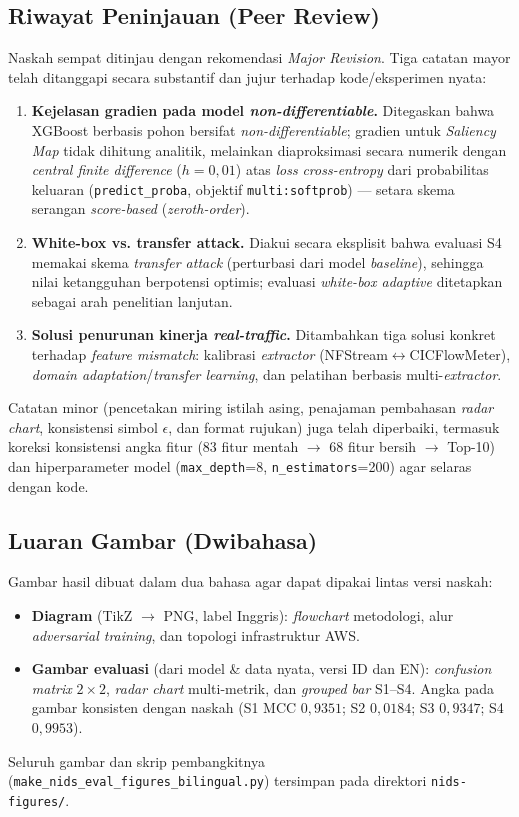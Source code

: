 \documentclass[11pt, a4paper]{article}
\begin{document}
\subsection{Riwayat Peninjauan (Peer Review)}
Naskah sempat ditinjau dengan rekomendasi \textit{Major Revision}. Tiga catatan mayor telah ditanggapi secara substantif dan jujur terhadap kode/eksperimen nyata:
\begin{enumerate}[leftmargin=1.4cm]
    \item \textbf{Kejelasan gradien pada model \textit{non-differentiable}.} Ditegaskan bahwa XGBoost berbasis pohon bersifat \textit{non-differentiable}; gradien untuk \textit{Saliency Map} tidak dihitung analitik, melainkan diaproksimasi secara numerik dengan \textit{central finite difference} ($h=0{,}01$) atas \textit{loss} \textit{cross-entropy} dari probabilitas keluaran (\texttt{predict\_proba}, objektif \texttt{multi:softprob}) --- setara skema serangan \textit{score-based} (\textit{zeroth-order}).
    \item \textbf{White-box vs. transfer attack.} Diakui secara eksplisit bahwa evaluasi S4 memakai skema \textit{transfer attack} (perturbasi dari model \textit{baseline}), sehingga nilai ketangguhan berpotensi optimis; evaluasi \textit{white-box adaptive} ditetapkan sebagai arah penelitian lanjutan.
    \item \textbf{Solusi penurunan kinerja \textit{real-traffic}.} Ditambahkan tiga solusi konkret terhadap \textit{feature mismatch}: kalibrasi \textit{extractor} (NFStream$\leftrightarrow$CICFlowMeter), \textit{domain adaptation}/\textit{transfer learning}, dan pelatihan berbasis multi-\textit{extractor}.
\end{enumerate}
Catatan minor (pencetakan miring istilah asing, penajaman pembahasan \textit{radar chart}, konsistensi simbol $\epsilon$, dan format rujukan) juga telah diperbaiki, termasuk koreksi konsistensi angka fitur (83 fitur mentah $\rightarrow$ 68 fitur bersih $\rightarrow$ Top-10) dan hiperparameter model (\texttt{max\_depth}=8, \texttt{n\_estimators}=200) agar selaras dengan kode.

\subsection{Luaran Gambar (Dwibahasa)}
Gambar hasil dibuat dalam dua bahasa agar dapat dipakai lintas versi naskah:
\begin{itemize}[leftmargin=1.4cm]
    \item \textbf{Diagram} (TikZ $\rightarrow$ PNG, label Inggris): \textit{flowchart} metodologi, alur \textit{adversarial training}, dan topologi infrastruktur AWS.
    \item \textbf{Gambar evaluasi} (dari model \& data nyata, versi ID dan EN): \textit{confusion matrix} $2\times 2$, \textit{radar chart} multi-metrik, dan \textit{grouped bar} S1--S4. Angka pada gambar konsisten dengan naskah (S1 MCC $0{,}9351$; S2 $0{,}0184$; S3 $0{,}9347$; S4 $0{,}9953$).
\end{itemize}
Seluruh gambar dan skrip pembangkitnya (\texttt{make\_nids\_eval\_figures\_bilingual.py}) tersimpan pada direktori \texttt{nids-figures/}.
\end{document}
